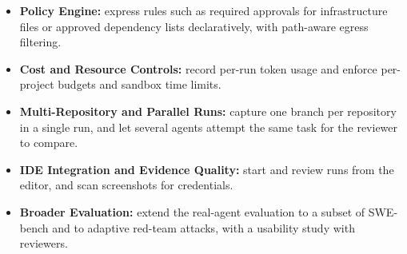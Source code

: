 \documentclass[12pt,a4paper,oneside]{report}
\providecommand{\tightlist}{\setlength{\itemsep}{0pt}\setlength{\parskip}{0pt}}
\begin{document}
\begin{itemize}
\tightlist
\item
  \textbf{Policy Engine:} express rules such as required approvals for infrastructure files or approved dependency lists declaratively, with path-aware egress filtering.
\item
  \textbf{Cost and Resource Controls:} record per-run token usage and enforce per-project budgets and sandbox time limits.
\item
  \textbf{Multi-Repository and Parallel Runs:} capture one branch per repository in a single run, and let several agents attempt the same task for the reviewer to compare.
\item
  \textbf{IDE Integration and Evidence Quality:} start and review runs from the editor, and scan screenshots for credentials.
\item
  \textbf{Broader Evaluation:} extend the real-agent evaluation to a subset of SWE-bench \cite{ref2} and to adaptive red-team attacks, with a usability study with reviewers.
\end{itemize}

\clearpage
\end{document}
